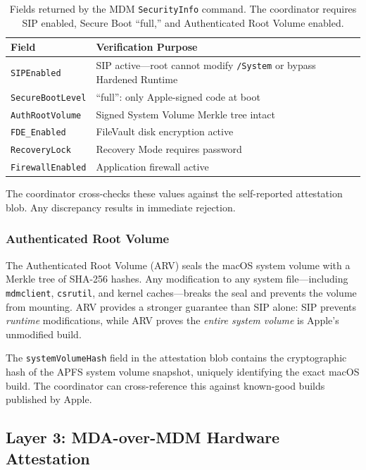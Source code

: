 \documentclass[10pt,twocolumn,letterpaper]{article}
\begin{document}
\begin{table}[h]
\centering
\caption{Fields returned by the MDM \texttt{SecurityInfo} command. The coordinator requires SIP enabled, Secure Boot ``full,'' and Authenticated Root Volume enabled.}
\vspace{4pt}
\small
\begin{tabular}{@{}lp{4.2cm}@{}}
\toprule
\textbf{Field} & \textbf{Verification Purpose} \\
\midrule
\texttt{SIPEnabled} & SIP active---root cannot modify \texttt{/System} or bypass Hardened Runtime \\
\texttt{SecureBootLevel} & ``full'': only Apple-signed code at boot \\
\texttt{AuthRootVolume} & Signed System Volume Merkle tree intact \\
\texttt{FDE\_Enabled} & FileVault disk encryption active \\
\texttt{RecoveryLock} & Recovery Mode requires password \\
\texttt{FirewallEnabled} & Application firewall active \\
\bottomrule
\end{tabular}
\end{table}

The coordinator cross-checks these values against the self-reported attestation blob. Any discrepancy results in immediate rejection.

\subsubsection{Authenticated Root Volume}
\label{sec:arv}

The Authenticated Root Volume (ARV) seals the macOS system volume with a Merkle tree of SHA-256 hashes. Any modification to any system file---including \texttt{mdmclient}, \texttt{csrutil}, and kernel caches---breaks the seal and prevents the volume from mounting. ARV provides a stronger guarantee than SIP alone: SIP prevents \emph{runtime} modifications, while ARV proves the \emph{entire system volume} is Apple's unmodified build.

The \texttt{systemVolumeHash} field in the attestation blob contains the cryptographic hash of the APFS system volume snapshot, uniquely identifying the exact macOS build. The coordinator can cross-reference this against known-good builds published by Apple.

\subsection{Layer 3: MDA-over-MDM Hardware Attestation}
\label{sec:mda}
\end{document}
